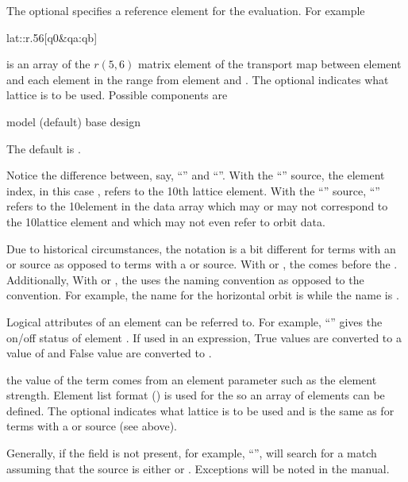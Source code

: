The optional  specifies a reference
element for the evaluation. For example
\begin{example}
  lat::r.56[q0\&qa:qb]
\end{example}  
is an array of the $r(5,6)$ matrix element of the transport map
between element  and each element in the range from element
 and . The optional  indicates what
lattice is to be used. Possible components are
\begin{example}
  model (default)
  base
  design
\end{example}
The default is .

Notice the difference between, say, ``'' and
``''. With the ``'' source, the element 
index, in this case , refers to the 10th lattice element. With the
``'' source, ``'' refers to the 10\Th element in
the  data array which may or may not correspond to the
10\Th lattice element and which may not even refer to orbit data.

Due to historical circumstances, the notation is a bit different for
terms with an  or  source as opposed to terms with
a  or  source. With  or , the
 comes before the . Additionally,
With  or , the  uses the \bmad
naming convention as opposed to the \tao convention. For example, the
\tao name for the horizontal orbit is  while the \bmad
name is .

Logical attributes of an element can be referred to. For example,
``'' gives the on/off status of element
. If used in an expression, True values are converted to a
value of  and False value are converted to .

the value of the term comes from an element parameter such as the
element strength.  Element list format () is
used for the  so an array of elements can be
defined.  The optional  indicates what lattice is to
be used and is the same as for terms with a  or 
source (see above).

Generally, if the  field is not present, for example, 
``'', \tao will search 
for a match assuming that the source is either  or . 
Exceptions will be noted in the manual.
